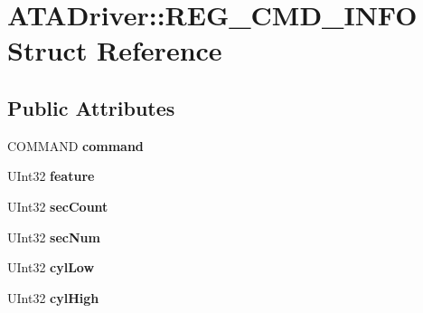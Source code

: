 \hypertarget{struct_a_t_a_driver_1_1_r_e_g___c_m_d___i_n_f_o}{}\section{A\+T\+A\+Driver\+:\+:R\+E\+G\+\_\+\+C\+M\+D\+\_\+\+I\+N\+FO Struct Reference}
\label{struct_a_t_a_driver_1_1_r_e_g___c_m_d___i_n_f_o}
\subsection*{Public Attributes}
\begin{DoxyCompactItemize}
\item 
\mbox{\label{struct_a_t_a_driver_1_1_r_e_g___c_m_d___i_n_f_o_a43f9f9c0fbb2c8c2b648f7c00e8ba111}} 
C\+O\+M\+M\+A\+ND {\bfseries command}
\item 
\mbox{\label{struct_a_t_a_driver_1_1_r_e_g___c_m_d___i_n_f_o_a7df5f1f5a9b1a9fbdf965f6e21fe5870}} 
U\+Int32 {\bfseries feature}
\item 
\mbox{\label{struct_a_t_a_driver_1_1_r_e_g___c_m_d___i_n_f_o_ab00676b39ce75bba1e70dd308bdeff74}} 
U\+Int32 {\bfseries sec\+Count}
\item 
\mbox{\label{struct_a_t_a_driver_1_1_r_e_g___c_m_d___i_n_f_o_a1e6b39b723c7cbacfcb9568f03b83e94}} 
U\+Int32 {\bfseries sec\+Num}
\item 
\mbox{\label{struct_a_t_a_driver_1_1_r_e_g___c_m_d___i_n_f_o_a6e1772608782889f008c0adddf0d59f8}} 
U\+Int32 {\bfseries cyl\+Low}
\item 
\mbox{\label{struct_a_t_a_driver_1_1_r_e_g___c_m_d___i_n_f_o_abe490a6c359b4747c626bef43d9865c2}} 
U\+Int32 {\bfseries cyl\+High}
\item 
\mbox{\label{struct_a_t_a_driver_1_1_r_e_g___c_m_d___i_n_f_o_a68b103cf72d907afcfd95b81df0ac534}} 

\end{DoxyCompactItemize}
